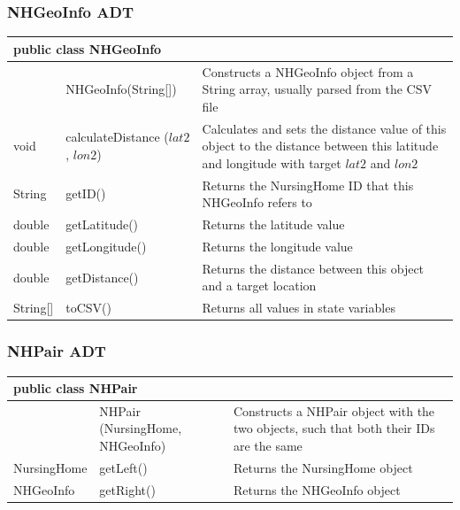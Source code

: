 \documentclass[12pt]{article}
\begin{document}
\subsubsection{NHGeoInfo ADT}
\begin{center}
\begin{tabular}{p{0.1\hsize}|p{0.25\hsize}|p{0.50\hsize}}
\multicolumn{3}{l}{\textbf{public class NHGeoInfo}} \\
\hline
 & NHGeoInfo(String[]) & Constructs a NHGeoInfo object from a String array, usually parsed from the CSV file\\
\hline
void 	& calculateDistance ($lat2$, $lon2$) & Calculates and sets the distance value of this object to the distance between this latitude and longitude with target $lat2$ and $lon2$\\
\hline
String 	& getID() & Returns the NursingHome ID that this NHGeoInfo refers to\\
\hline
double 	& getLatitude() & Returns the latitude value\\
\hline
double 	& getLongitude() & Returns the longitude value \\
\hline
double 	& getDistance() & Returns the distance between this object and a target location \\
\hline
String[] 	& toCSV() & Returns all values in state variables\\
\hline
\end{tabular}
\end{center}


\subsubsection{NHPair ADT}
\begin{center}
\begin{tabular}{p{0.18\hsize}|p{0.17\hsize}|p{0.50\hsize}}
\multicolumn{3}{l}{\textbf{public class NHPair}} \\
\hline
 & NHPair (NursingHome, NHGeoInfo) & Constructs a NHPair object with the two objects, such that both their IDs are the same \\
\hline
NursingHome 	& getLeft() & Returns the NursingHome object\\
\hline
NHGeoInfo		& getRight() & Returns the NHGeoInfo object\\
\hline
\end{tabular}
\end{center}

\bigskip
\end{document}
